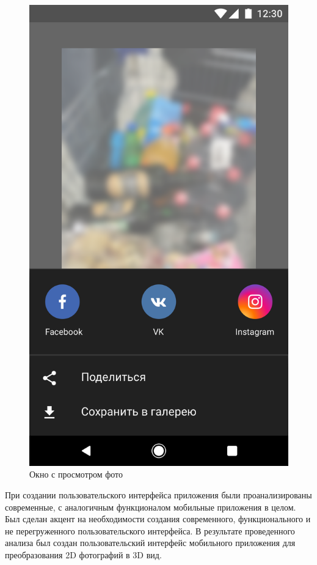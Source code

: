 \begin{figure}[H]
	\centering
	\includegraphics[width=0.6\linewidth]{pics/Artboard2}
	\caption{Окно с просмотром фото}
	\label{fig:Artboard2}
\end{figure}

При создании пользовательского интерфейса приложения были проанализированы современные, с аналогичным функционалом мобильные приложения в целом. Был сделан акцент на необходимости создания современного, функционального и не перегруженного пользовательского интерфейса. В результате проведенного анализа был создан пользовательский интерфейс мобильного приложения для преобразования 2D фотографий в 3D вид.